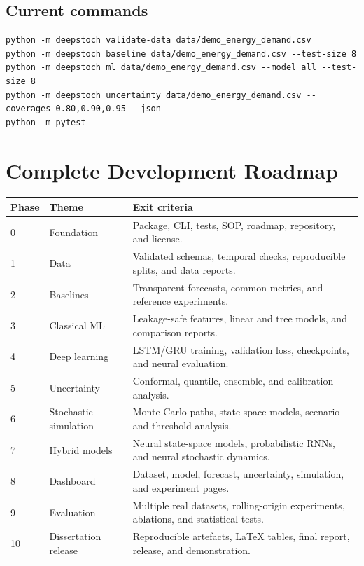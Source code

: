 \documentclass[11pt,a4paper]{report}
\begin{document}
\section{Current commands}
\begin{lstlisting}
python -m deepstoch validate-data data/demo_energy_demand.csv
python -m deepstoch baseline data/demo_energy_demand.csv --test-size 8
python -m deepstoch ml data/demo_energy_demand.csv --model all --test-size 8
python -m deepstoch uncertainty data/demo_energy_demand.csv --coverages 0.80,0.90,0.95 --json
python -m pytest
\end{lstlisting}

\chapter{Complete Development Roadmap}
\begin{longtable}{p{}p{}p{}}
\toprule
\textbf{Phase} & \textbf{Theme} & \textbf{Exit criteria} \\
\midrule
0 & Foundation & Package, CLI, tests, SOP, roadmap, repository, and license. \\
1 & Data & Validated schemas, temporal checks, reproducible splits, and data reports. \\
2 & Baselines & Transparent forecasts, common metrics, and reference experiments. \\
3 & Classical ML & Leakage-safe features, linear and tree models, and comparison reports. \\
4 & Deep learning & LSTM/GRU training, validation loss, checkpoints, and neural evaluation. \\
5 & Uncertainty & Conformal, quantile, ensemble, and calibration analysis. \\
6 & Stochastic simulation & Monte Carlo paths, state-space models, scenario and threshold analysis. \\
7 & Hybrid models & Neural state-space models, probabilistic RNNs, and neural stochastic dynamics. \\
8 & Dashboard & Dataset, model, forecast, uncertainty, simulation, and experiment pages. \\
9 & Evaluation & Multiple real datasets, rolling-origin experiments, ablations, and statistical tests. \\
10 & Dissertation release & Reproducible artefacts, LaTeX tables, final report, release, and demonstration. \\
\bottomrule
\end{longtable}
\end{document}
